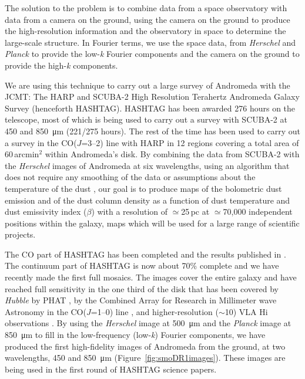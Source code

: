 \documentclass[a4paper,fleqn,usenatbib, twocolumn]{aastex63}
\begin{document}
The solution to the problem is to combine data from a space
observatory with data from a camera on the ground, using the camera on the
ground to produce the high-resolution information and the observatory
in space to determine the large-scale structure. In Fourier terms, we use the
space data, from {\it Herschel} and {\it Planck} to provide the low-\textit{k} Fourier 
components and the camera on the ground to provide the high-\textit{k} components.


We are using this technique to carry out a large survey of Andromeda with the
JCMT: The HARP and SCUBA-2 High Resolution Terahertz Andromeda Galaxy Survey (henceforth HASHTAG). HASHTAG has been awarded 276 hours on the telescope, most of
which is being used to carry out a survey with SCUBA-2 at 450 and 
\SI{850}{\micro \meter} (221/275 hours). The rest of the time has been used to carry out a survey in the
CO($J$=3--2) line with HARP in 12 regions covering a total area
of 60\,arcmin$^2$ within Andromeda's disk. 
By combining the data from SCUBA-2 with the
{\it Herschel} images of Andromeda at six wavelengths, using an algorithm that does not
require any smoothing of the data or assumptions about the temperature of the
dust \citep{marsh2015}, our goal is to produce maps of the bolometric dust emission and of the
dust column density as a function of dust temperature and dust emissivity index ($\beta$) with a resolution
of $\simeq$25\,pc at 
$\simeq$70,000 independent
positions within the galaxy, maps which will be used for a large range of scientific projects. 


The CO part of HASHTAG has been completed and the results published in
\citet{Li2020}. The continuum part of HASHTAG is now about 70\% complete
and we have recently made the first full mosaics. The images cover the entire galaxy
and have reached full sensitivity in the one third of the
disk that has been covered by {\it Hubble} by PHAT \citep{dalcanton2012}, by the Combined Array for Research
in Millimeter wave Astronomy in the CO($J$=1--0) line \citep{CalduPrimo2016}, and higher-resolution ($\sim$10\arcsec) VLA H{\sc i} observations \citep{Koch2021}. 
By using the {\it Herschel} image
at \SI{500}{\micro \meter} \citep{fritz2012} and the {\it Planck} image at \SI{850}{\micro\meter} \citep{planck2015} to
fill in the low-frequency (low-\textit{k}) Fourier components, we have produced the first high-fidelity
images of Andromeda from the ground, at two wavelengths, 450 and \SI{850}{\micro\meter} (Figure~\ref{fig:smoDR1images}). These images are
being used in the first round of HASHTAG science papers.
\end{document}
